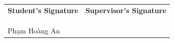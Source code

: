 \documentclass[12pt,a4paper]{article}
\begin{document}
\vspace{1.5cm}

\noindent
\begin{tabularx}{\textwidth}{XX}
    \centering\textbf{Student's Signature} & \centering\textbf{Supervisor's Signature} \tabularnewline
    & \tabularnewline
    & \tabularnewline
    & \tabularnewline
    \centering Phạm Hoàng An & \centering\arraybackslash \\
\end{tabularx}
\end{document}
